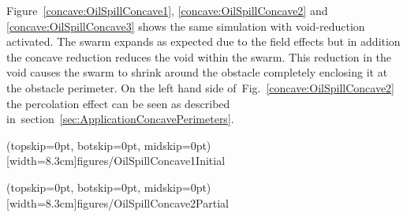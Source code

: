 \documentclass{ieeeaccess}
\begin{document}
Figure~\ref{concave:OilSpillConcave1}, \ref{concave:OilSpillConcave2} and \ref{concave:OilSpillConcave3} shows the same simulation with void-reduction activated. The swarm expands as expected due to the field effects but in addition the concave reduction reduces the void within the swarm. This reduction in the void causes the swarm to shrink around the obstacle completely enclosing it at the obstacle perimeter. On the left hand side of~Fig.~\ref{concave:OilSpillConcave2} the percolation effect can be seen as described in~section~\ref{sec:ApplicationConcavePerimeters}.

\Figure[t!](topskip=0pt, botskip=0pt, midskip=0pt)[width=8.3cm]{figures/OilSpillConcave1}{Initial\label{concave:OilSpillConcave1}}

\Figure[t!](topskip=0pt, botskip=0pt, midskip=0pt)[width=8.3cm]{figures/OilSpillConcave2}{Partial\label{concave:OilSpillConcave2}}
\end{document}
